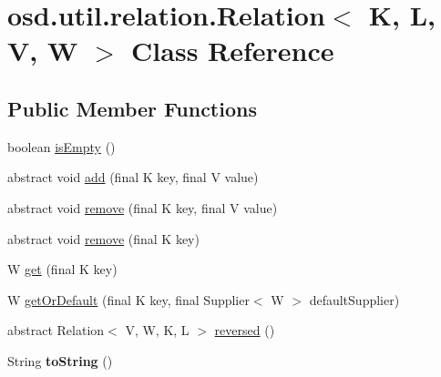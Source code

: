 \hypertarget{classosd_1_1util_1_1relation_1_1_relation_3_01_k_00_01_l_00_01_v_00_01_w_01_4}{\section{osd.\-util.\-relation.\-Relation$<$ K, L, V, W $>$ Class Reference}
\label{classosd_1_1util_1_1relation_1_1_relation_3_01_k_00_01_l_00_01_v_00_01_w_01_4}
}
\subsection*{Public Member Functions}
\begin{DoxyCompactItemize}
\item 
boolean \hyperlink{classosd_1_1util_1_1relation_1_1_relation_3_01_k_00_01_l_00_01_v_00_01_w_01_4_a0fb60240f1e512b1a294d121369f2889}{is\-Empty} ()
\item 
abstract void \hyperlink{classosd_1_1util_1_1relation_1_1_relation_3_01_k_00_01_l_00_01_v_00_01_w_01_4_ac4f315e51beb01d03f41b04dcc26d08e}{add} (final K key, final V value)
\item 
abstract void \hyperlink{classosd_1_1util_1_1relation_1_1_relation_3_01_k_00_01_l_00_01_v_00_01_w_01_4_a12762a3cab5c2992fb4ba707dd7353de}{remove} (final K key, final V value)
\item 
abstract void \hyperlink{classosd_1_1util_1_1relation_1_1_relation_3_01_k_00_01_l_00_01_v_00_01_w_01_4_a18530eaa2e035ad2940cd724276d4645}{remove} (final K key)
\item 
W \hyperlink{classosd_1_1util_1_1relation_1_1_relation_3_01_k_00_01_l_00_01_v_00_01_w_01_4_aacda8aa86e25b21488c4f2b4f67f88fe}{get} (final K key)
\item 
W \hyperlink{classosd_1_1util_1_1relation_1_1_relation_3_01_k_00_01_l_00_01_v_00_01_w_01_4_a432a888f2e80c5ad876bbb52d2b726f3}{get\-Or\-Default} (final K key, final Supplier$<$ W $>$ default\-Supplier)
\item 
abstract Relation$<$ V, W, K, L $>$ \hyperlink{classosd_1_1util_1_1relation_1_1_relation_3_01_k_00_01_l_00_01_v_00_01_w_01_4_ae94126ee35d81ad47715ab7db282b7e3}{reversed} ()
\item 
\hypertarget{classosd_1_1util_1_1relation_1_1_relation_3_01_k_00_01_l_00_01_v_00_01_w_01_4_a83ac26a5d528be62427b62f765db8424}{String {\bfseries to\-String} ()}\label{classosd_1_1util_1_1relation_1_1_relation_3_01_k_00_01_l_00_01_v_00_01_w_01_4_a83ac26a5d528be62427b62f765db8424}

\end{DoxyCompactItemize}
